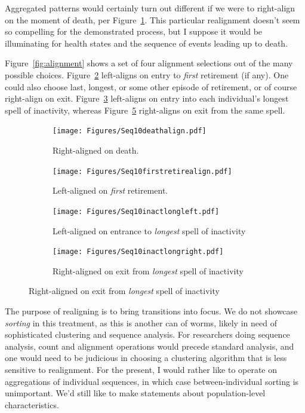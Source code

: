 \documentclass{article}
\begin{document}
Aggregated patterns
would certainly turn out different if we were to right-align on the moment of death, per Figure~\ref{fig:seq10death}.
This particular realignment doesn't seem so compelling for the
demonstrated process, but I suppose it would be
illuminating for health states and the sequence of events leading up to death.

Figure~\ref{fig:alignment} shows a set of four alignment selections out of the
many possible choices. Figure~\ref{fig:firstretire} left-aligns on
entry to \emph{first} retirement (if any). One could also choose last, longest,
or some other episode of retirement, or of course right-align on exit.
Figure~\ref{fig:longinactleft} left-aligns on entry into each individual's
longest spell of inactivity, whereas Figure~\ref{fig:longinactright} right-aligns on exit from
the same spell.

 \begin{figure}[ht!]
\centering
\caption{The sequences from Figure~\ref{fig:seq10} under a variety of alignment
types.}
\label{fig:alignment}

\begin{subfigure}{\textwidth}
\centering
\caption{Right-aligned on death.}
\label{fig:seq10death}
\texttt{[image: Figures/Seq10deathalign.pdf]}
\end{subfigure}

\begin{subfigure}{\textwidth}
\centering
\caption{Left-aligned on \emph{first} retirement.}
\label{fig:firstretire}
\texttt{[image: Figures/Seq10firstretirealign.pdf]}
\end{subfigure}

\begin{subfigure}{\textwidth}
\centering
\caption{Left-aligned on entrance to \emph{longest} spell of inactivity}
\label{fig:longinactleft}
\texttt{[image: Figures/Seq10inactlongleft.pdf]}
\end{subfigure}

\begin{subfigure}{\textwidth}
\centering
\caption{Right-aligned on exit from \emph{longest} spell of inactivity}
\label{fig:longinactright}
\texttt{[image: Figures/Seq10inactlongright.pdf]}
\end{subfigure}

\end{figure}

The purpose of realigning is to bring transitions into focus. We do not showcase
\emph{sorting} in this treatment, as this is another can of worms, likely in
need of sophisticated clustering and sequence analysis. For researchers doing
sequence analysis, count and alignment operations would precede standard
analysis, and one would need to be judicious in choosing a clustering algorithm
that is less sensitive to realignment. For the present, I would rather
like to operate on aggregations of individual sequences, in which case between-individual sorting is unimportant. We'd still like to make statements about population-level characteristics.
\end{document}

